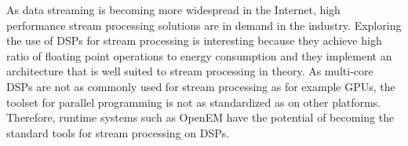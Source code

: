 As data streaming is becoming more widespread in the Internet, high performance stream processing solutions are in demand in the industry. Exploring the use of DSPs for stream processing is interesting because they achieve high ratio of floating point operations to energy consumption and they implement an architecture that is well suited to stream processing in theory. As multi-core DSPs are not as commonly used for stream processing as for example GPUs, the toolset for parallel programming is not as standardized as on other platforms. Therefore, runtime systems such as OpenEM have the potential of becoming the standard tools for stream processing on DSPs.
